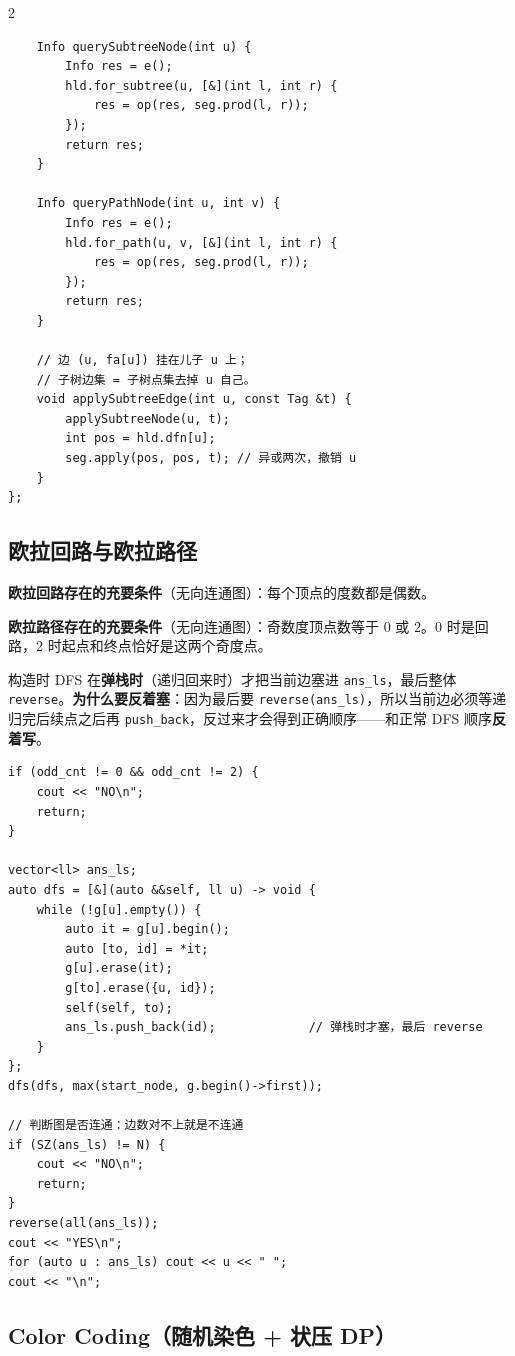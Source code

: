 \begin{multicols*}{2}
\begin{verbatim}
    Info querySubtreeNode(int u) {
        Info res = e();
        hld.for_subtree(u, [&](int l, int r) {
            res = op(res, seg.prod(l, r));
        });
        return res;
    }

    Info queryPathNode(int u, int v) {
        Info res = e();
        hld.for_path(u, v, [&](int l, int r) {
            res = op(res, seg.prod(l, r));
        });
        return res;
    }

    // 边 (u, fa[u]) 挂在儿子 u 上；
    // 子树边集 = 子树点集去掉 u 自己。
    void applySubtreeEdge(int u, const Tag &t) {
        applySubtreeNode(u, t);
        int pos = hld.dfn[u];
        seg.apply(pos, pos, t); // 异或两次，撤销 u
    }
};
		\end{verbatim}


		\subsection{欧拉回路与欧拉路径}

		\textbf{欧拉回路存在的充要条件}（无向连通图）：每个顶点的度数都是偶数。

		\textbf{欧拉路径存在的充要条件}（无向连通图）：奇数度顶点数等于 $0$ 或 $2$。$0$ 时是回路，$2$ 时起点和终点恰好是这两个奇度点。

		构造时 DFS 在\textbf{弹栈时}（递归回来时）才把当前边塞进 \texttt{ans\_ls}，最后整体 \texttt{reverse}。\textbf{为什么要反着塞}：因为最后要 \texttt{reverse(ans\_ls)}，所以当前边必须等递归完后续点之后再 \texttt{push\_back}，反过来才会得到正确顺序——和正常 DFS 顺序\textbf{反着写}。

		\begin{verbatim}
if (odd_cnt != 0 && odd_cnt != 2) {
    cout << "NO\n";
    return;
}

vector<ll> ans_ls;
auto dfs = [&](auto &&self, ll u) -> void {
    while (!g[u].empty()) {
        auto it = g[u].begin();
        auto [to, id] = *it;
        g[u].erase(it);
        g[to].erase({u, id});
        self(self, to);
        ans_ls.push_back(id);             // 弹栈时才塞，最后 reverse
    }
};
dfs(dfs, max(start_node, g.begin()->first));

// 判断图是否连通：边数对不上就是不连通
if (SZ(ans_ls) != N) {
    cout << "NO\n";
    return;
}
reverse(all(ans_ls));
cout << "YES\n";
for (auto u : ans_ls) cout << u << " ";
cout << "\n";
		\end{verbatim}


		\subsection{Color Coding（随机染色 + 状压 DP）}


\end{multicols*}
